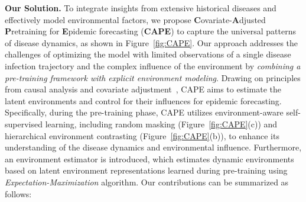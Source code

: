 \textbf{Our Solution.} 
To integrate insights from extensive historical diseases and effectively model environmental factors, we propose \textbf{C}ovariate-\textbf{A}djusted \textbf{P}retraining for \textbf{E}pidemic forecasting (\textbf{CAPE}) to capture the universal patterns of disease dynamics, as shown in Figure~\ref{fig:CAPE}. Our approach addresses the challenges of optimizing the model with limited observations of a single disease infection trajectory and the complex influence of the environment by \textit{combining a pre-training framework with explicit environment modeling}. Drawing on principles from causal analysis and covariate adjustment~\cite{runge2023causal}, CAPE aims to estimate the latent environments and control for their influences for epidemic forecasting. Specifically, during the pre-training phase, CAPE utilizes environment-aware self-supervised learning, including random masking (Figure~\ref{fig:CAPE}(c)) and hierarchical environment contrasting (Figure~\ref{fig:CAPE}(b)), to enhance its understanding of the disease dynamics and environmental influence. Furthermore, an environment estimator is introduced, which estimates dynamic environments based on latent environment representations learned during pre-training using \textit{Expectation-Maximization} algorithm. Our contributions can be summarized as follows:

